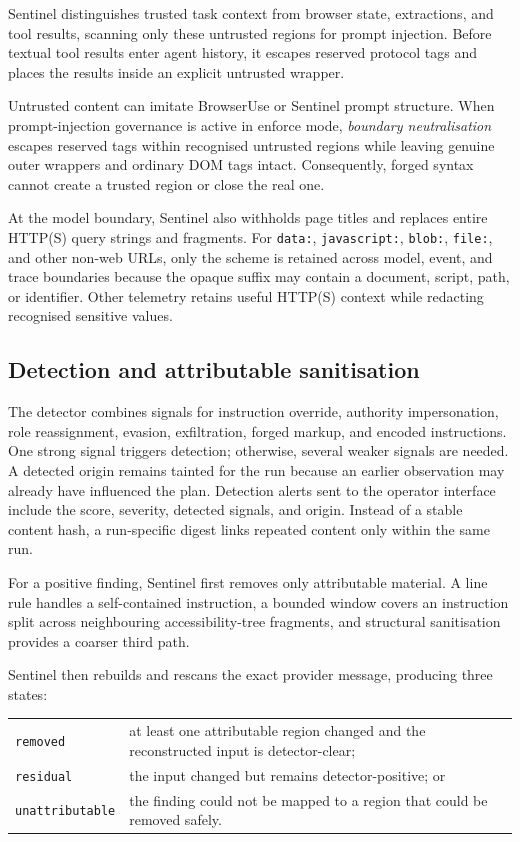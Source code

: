 Sentinel distinguishes trusted task context from browser state, extractions, and
tool results, scanning only these untrusted regions for prompt injection. Before
textual tool results enter agent history, it escapes reserved protocol tags and
places the results inside an explicit untrusted wrapper.

Untrusted content can imitate BrowserUse or Sentinel prompt structure. When
prompt-injection governance is active in enforce mode, \emph{boundary
neutralisation} escapes reserved tags within recognised untrusted regions while
leaving genuine outer wrappers and ordinary DOM tags intact. Consequently,
forged syntax cannot create a trusted region or close the real one.

At the model boundary, Sentinel also withholds page titles and replaces entire
HTTP(S) query strings and fragments. For \texttt{data:}, \texttt{javascript:},
\texttt{blob:}, \texttt{file:}, and other non-web URLs, only the scheme is
retained across model, event, and trace boundaries because the opaque suffix may
contain a document, script, path, or identifier. Other telemetry retains useful
HTTP(S) context while redacting recognised sensitive values.

\subsection{Detection and attributable sanitisation}

The detector combines signals for instruction override, authority
impersonation, role reassignment, evasion, exfiltration, forged markup, and
encoded instructions. One strong signal triggers detection; otherwise, several
weaker signals are needed.
A detected origin remains tainted for the run because an earlier observation
may already have influenced the plan. Detection alerts sent to the operator
interface include the score, severity, detected signals, and origin. Instead of
a stable content hash, a run-specific digest links repeated content only within
the same run.

For a positive finding, Sentinel first removes only attributable material. A
line rule handles a self-contained instruction, a bounded window covers an
instruction split across neighbouring accessibility-tree fragments, and
structural sanitisation provides a coarser third path.

Sentinel then rebuilds and rescans the exact provider message, producing three
states:

\noindent\begin{tabularx}{\textwidth}{@{}l@{\hspace{1.5em}}Y@{}}
  \texttt{removed} & at least one attributable region changed and the
  reconstructed input is detector-clear; \\
  \texttt{residual} & the input changed but remains detector-positive; or \\
  \texttt{unattributable} & the finding could not be mapped to a region that
  could be removed safely.
\end{tabularx}

